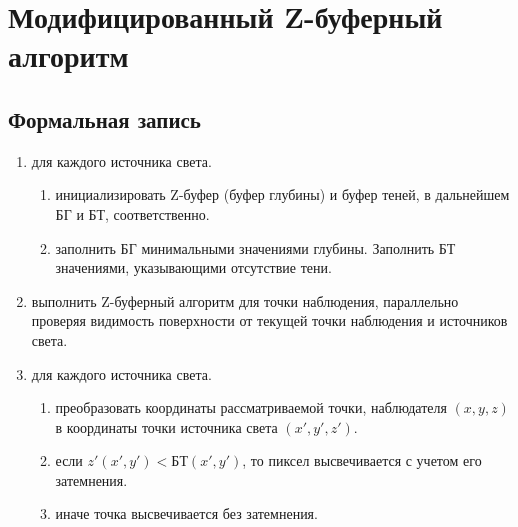 \clearpage


\clearpage



\section{Модифицированный Z-буферный алгоритм}

\subsection{Формальная запись}

\begin{enumerate}
	\item для каждого источника света.
	 
	 \begin{enumerate}[label=\arabic{enumi}.\arabic*]
	 	\item инициализировать Z-буфер (буфер глубины)  и буфер теней, в дальнейшем БГ и БТ, соответственно.
	 	\item заполнить БГ минимальными значениями глубины.
	 	Заполнить БТ значениями, указывающими отсутствие тени.
	 \end{enumerate}

	\item выполнить Z-буферный алгоритм для точки наблюдения, параллельно проверяя видимость поверхности от текущей точки наблюдения и источников света.
    \item для каждого источника света.
    
    \begin{enumerate}[label=\arabic{enumi}.\arabic*]
    \item преобразовать координаты рассматриваемой точки, наблюдателя $(x, y, z)$ в координаты точки источника света $(x', y', z')$.
    \item если $z'(x', y') < БТ(x', y')$, то пиксел высвечивается с учетом его затемнения.
    \item  иначе точка высвечивается без затемнения.
   	\end{enumerate}
   
   
\end{enumerate}


\clearpage

\clearpage
